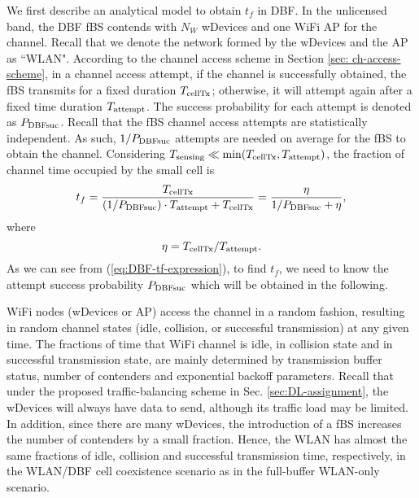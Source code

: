 \documentclass[journal,final,letterpaper,10pt,doublecolumn,twoside]{IEEEtran}
\begin{document}
We first describe an analytical model to obtain $t_f$ in DBF.
In the unlicensed band, the DBF fBS contends with $N_W$ wDevices and one WiFi AP for the channel. Recall that we denote the network formed by the wDevices and the AP as ``WLAN".
According to the channel access scheme in Section \ref{sec: ch-access-scheme}, in a channel access attempt, if the channel is successfully obtained, the
fBS transmits for a fixed duration $T_{\textmd{cellTx}}$; otherwise,
it will attempt again after a fixed time duration
$T_{\textmd{attempt}}$. The success probability for each attempt is denoted as $P_{\textmd{DBFsuc}}$. Recall that the fBS channel access attempts are
statistically independent. As such, $1/P_{\textmd{DBFsuc}}$
attempts are needed on average for the fBS to obtain the channel. Considering $T_\textmd{sensing} \ll \min(T_{\textmd{cellTx}},  T_{\textmd{attempt}})$, the fraction
of channel time occupied by the small cell is
\begin{equation}
t_f =    \frac{T_{\textmd{cellTx}}} {(1/P_{\textmd{DBFsuc}}) \cdot
T_{\textmd{attempt}} + T_{\textmd{cellTx}} }
 =    \frac{\eta}{1/P_{\textmd{DBFsuc}} +  \eta  },
\label{eq:DBF-tf-expression}
\end{equation}
where
\begin{equation}
\eta  =    T_{\textmd{cellTx}}  /  T_{\textmd{attempt}}.
\label{eq:DBF-eta-protocol-def} \nonumber
\end{equation}
As we can see from (\ref{eq:DBF-tf-expression}), to find $t_f$, we need to know the attempt success probability $P_{\textmd{DBFsuc}}$ which will be obtained in the following.

WiFi nodes (wDevices or AP) access the channel in a random fashion, resulting in
random channel states (idle, collision, or successful transmission)
at any given time. The fractions of time that WiFi channel is idle,
in collision state and in successful transmission state, are mainly
determined by transmission buffer status, number of contenders and
exponential backoff parameters. Recall that under the proposed
traffic-balancing scheme in Sec. \ref{sec:DL-assignment},  the wDevices
will always have data to send, although its traffic load may be
limited. In addition, since there are many wDevices, the
introduction of a fBS increases the number of contenders by a small
fraction. Hence, the WLAN has almost the same fractions of idle,
collision and successful transmission time, respectively, in the
WLAN/DBF cell coexistence scenario as in the full-buffer WLAN-only
scenario.
\end{document}
